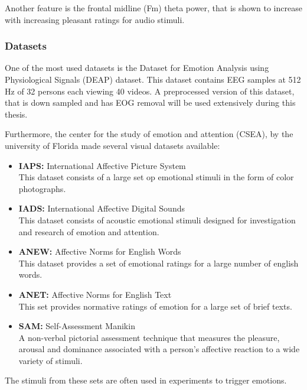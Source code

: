 \npar

Another feature is the frontal midline (Fm) theta power, that is shown to increase with increasing pleasant ratings for audio stimuli\cite{MusicPaper}. %

\subsubsection{Datasets}
One of the most used datasets is the Dataset for Emotion Analysis using Physiological Signals (DEAP) dataset\cite{DEAP}. This dataset contains EEG samples at 512 Hz of 32 persons each viewing 40 videos. A preprocessed version of this dataset, that is down sampled and has EOG removal will be used extensively during this thesis.

\clearpage

Furthermore, the center for the study of emotion and attention (CSEA), by the university of Florida made several visual datasets available:
\begin{itemize}
\item \textbf{IAPS:} International Affective Picture System\\
This dataset consists of a large set op emotional stimuli in the form of color photographs.
\item \textbf{IADS:} International Affective Digital Sounds \\
This dataset consists of acoustic emotional stimuli designed for investigation and research of emotion and attention.
\item \textbf{ANEW:} Affective Norms for English Words\\
This dataset provides a set of emotional ratings for a large number of english words.
\item \textbf{ANET:} Affective Norms for English Text\\
This set provides normative ratings of emotion for a large set of brief texts.
\item \textbf{SAM:} Self-Assessment Manikin\\
A non-verbal pictorial assessment technique that measures the pleasure, arousal and dominance associated with a person's affective reaction to a wide variety of stimuli.
\end{itemize}
The stimuli from these sets are often used in experiments to trigger emotions\cite{ExtendedPaper, EmotionSite, RealTimeEEGEmotion, EEGDatasets}.


